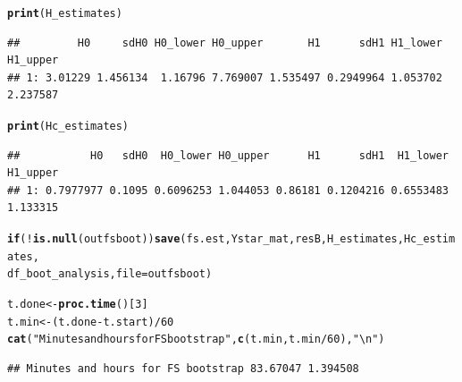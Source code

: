\documentclass[9pt]{article}\usepackage[]{graphicx}\usepackage[]{xcolor}
\makeatletter
\newcommand{\hlnum}[1]{\textcolor[rgb]{0.686,0.059,0.569}{#1}}%
\newcommand{\hlstr}[1]{\textcolor[rgb]{0.192,0.494,0.8}{#1}}%
\newcommand{\hlopt}[1]{\textcolor[rgb]{0,0,0}{#1}}%
\newcommand{\hlstd}[1]{\textcolor[rgb]{0.345,0.345,0.345}{#1}}%
\newcommand{\hlkwa}[1]{\textcolor[rgb]{0.161,0.373,0.58}{\textbf{#1}}}%
\newcommand{\hlkwb}[1]{\textcolor[rgb]{0.69,0.353,0.396}{#1}}%
\newcommand{\hlkwc}[1]{\textcolor[rgb]{0.333,0.667,0.333}{#1}}%
\newcommand{\hlkwd}[1]{\textcolor[rgb]{0.737,0.353,0.396}{\textbf{#1}}}%
\newenvironment{kframe}{%
 \def\at@end@of@kframe{}%
 \ifinner\ifhmode%
  \def\at@end@of@kframe{\end{minipage}}%
  \begin{minipage}{\columnwidth}%
 \fi\fi%
 \def\FrameCommand##1{\hskip\@totalleftmargin \hskip-\fboxsep
 \colorbox{shadecolor}{##1}\hskip-\fboxsep
     \hskip-\linewidth \hskip-\@totalleftmargin \hskip\columnwidth}%
 \MakeFramed {\advance\hsize-\width
   \@totalleftmargin\z@ \linewidth\hsize
   \@setminipage}}%
 {\par\unskip\endMakeFramed%
 \at@end@of@kframe}
\newenvironment{knitrout}{}{} %
\theoremstyle{definition}
\theoremstyle{remark}
\makeatother
\begin{document}
\begin{knitrout}
\begin{kframe}
\begin{alltt}
\hlkwd{print}\hlstd{(H_estimates)}
\end{alltt}
\begin{verbatim}
##         H0     sdH0 H0_lower H0_upper       H1      sdH1 H1_lower H1_upper
## 1: 3.01229 1.456134  1.16796 7.769007 1.535497 0.2949964 1.053702 2.237587
\end{verbatim}
\begin{alltt}
\hlkwd{print}\hlstd{(Hc_estimates)}
\end{alltt}
\begin{verbatim}
##           H0   sdH0  H0_lower H0_upper      H1      sdH1  H1_lower H1_upper
## 1: 0.7977977 0.1095 0.6096253 1.044053 0.86181 0.1204216 0.6553483 1.133315
\end{verbatim}
\begin{alltt}
\hlkwa{if} \hlstd{(}\hlopt{!}\hlkwd{is.null}\hlstd{(outfsboot))} \hlkwd{save}\hlstd{(fs.est, Ystar_mat, resB, H_estimates, Hc_estimates,}
    \hlstd{df_boot_analysis,} \hlkwc{file} \hlstd{= outfsboot)}
\end{alltt}
\end{kframe}
\end{knitrout}


\begin{knitrout}
\color{fgcolor}\begin{kframe}
\begin{alltt}
\hlstd{t.done} \hlkwb{<-} \hlkwd{proc.time}\hlstd{()[}\hlnum{3}\hlstd{]}
\hlstd{t.min} \hlkwb{<-} \hlstd{(t.done} \hlopt{-} \hlstd{t.start)}\hlopt{/}\hlnum{60}
\hlkwd{cat}\hlstd{(}\hlstr{"Minutes and hours for FS bootstrap"}\hlstd{,} \hlkwd{c}\hlstd{(t.min, t.min}\hlopt{/}\hlnum{60}\hlstd{),} \hlstr{"\textbackslash{}n"}\hlstd{)}
\end{alltt}
\begin{verbatim}
## Minutes and hours for FS bootstrap 83.67047 1.394508
\end{verbatim}
\end{kframe}
\end{knitrout}
\end{document}
